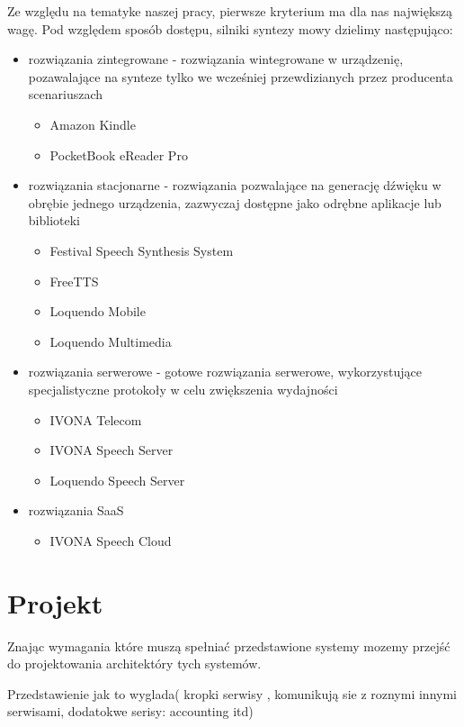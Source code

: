 Ze względu na tematyke naszej pracy, pierwsze kryterium ma dla nas największą wagę. Pod względem sposób dostępu, silniki syntezy mowy dzielimy następująco:

\begin{itemize}
	\item rozwiązania zintegrowane - rozwiązania wintegrowane w urządzenię, pozawalające na synteze tylko we wcześniej przewdizianych przez producenta scenariuszach
		\begin{itemize}
			\item  Amazon Kindle
			\item  PocketBook eReader Pro
		\end{itemize}
	\item rozwiązania stacjonarne - rozwiązania pozwalające na generację dźwięku w obrębie jednego urządzenia, zazwyczaj dostępne jako odrębne aplikacje lub biblioteki
		\begin{itemize}
			\item Festival Speech Synthesis System
			\item FreeTTS
			\item Loquendo Mobile
			\item Loquendo Multimedia
		\end{itemize}
	\item rozwiązania serwerowe - gotowe rozwiązania serwerowe, wykorzystujące specjalistyczne protokoły w celu zwiększenia wydajności 
		\begin{itemize}
			\item IVONA Telecom
			\item IVONA Speech Server
			\item Loquendo Speech Server
		\end{itemize}
	\item rozwiązania SaaS
		\begin{itemize}
			\item IVONA Speech Cloud
		\end{itemize}
\end{itemize}


\section {Projekt}

Znając wymagania które muszą spełniać przedstawione systemy mozemy przejść do projektowania architektóry tych systemów. 

Przedstawienie jak to wyglada( kropki serwisy , komunikują sie z roznymi innymi serwisami, dodatokwe serisy: accounting itd)

